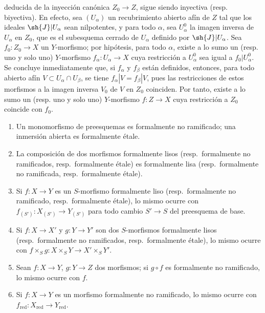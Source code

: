 \begin{remarks}[17.1.2]
\begin{enumerate}
  deducida de la inyección canónica $Z_0\to Z$, sigue siendo inyectiva (resp. biyectiva). En efecto, sea $(U_\alpha)$ un recubrimiento abierto afín de $Z$ tal que los ideales $\sh{J}|U_\alpha$ sean nilpotentes, y para todo $\alpha$, sea $U^0_\alpha$ la imagen inversa de $U_\alpha$ en $Z_0$, que es el subesquema cerrado de $U_\alpha$ definido por $\sh{J}|U_\alpha$. Sea $f_0:Z_0\to X$ un $Y$-morfismo; por hipótesis, para todo $\alpha$, existe a lo sumo un (resp. uno y solo uno) $Y$-morfismo $f_\alpha:U_\alpha\to X$ cuya restricción a $U^0_\alpha$ sea igual a $f_0|U^0_\alpha$. Se concluye inmediatamente que, si $f_\alpha$ y $f_\beta$ están definidos, entonces, para todo abierto afín $V\subset U_\alpha\cap U_\beta$, se tiene $f_\alpha|V=f_\beta|V$, pues las restricciones de estos morfismos a la imagen inversa $V_0$ de $V$ en $Z_0$ coinciden. Por tanto, existe a lo sumo un (resp. uno y solo uno) $Y$-morfismo $f:Z\to X$ cuya restricción a $Z_0$ coincide con $f_0$.
\end{enumerate}
\end{remarks}

\begin{proposition}[17.1.3]
\label{IV.17.1.3}
\begin{enumerate}
  \item[\textup{(i)}] Un monomorfismo de preesquemas es formalmente no ramificado; una inmersión abierta es formalmente étale.
  \item[\textup{(ii)}] La composición de dos morfismos formalmente lisos \textup{(resp.}\ formalmente no ramificados, \textup{resp.}\ formalmente étale\textup{)} es formalmente lisa \textup{(resp.}\ formalmente no ramificada, \textup{resp.}\ formalmente étale\textup{)}.
  \item[\textup{(iii)}] Si $f:X\to Y$ es un $S$-morfismo formalmente liso \textup{(resp.}\ formalmente no ramificado, \textup{resp.}\ formalmente étale\textup{)}, lo mismo ocurre con $f_{(S')}:X_{(S')}\to Y_{(S')}$ para todo cambio $S'\to S$ del preesquema de base.
  \item[\textup{(iv)}] Si $f:X\to X'$ y $g:Y\to Y'$ son dos $S$-morfismos formalmente lisos \textup{(resp.}\ formalmente no ramificados, \textup{resp.}\ formalmente étale\textup{)}, lo mismo ocurre con $f\times_S g:X\times_S Y\to X'\times_S Y'$.
  \item[\textup{(v)}] Sean $f:X\to Y$, $g:Y\to Z$ dos morfismos; si $g\circ f$ es formalmente no ramificado, lo mismo ocurre con $f$.
  \item[\textup{(vi)}] Si $f:X\to Y$ es un morfismo formalmente no ramificado, lo mismo ocurre con $f_{\mathrm{red}}:X_{\mathrm{red}}\to Y_{\mathrm{red}}$.
\end{enumerate}
\end{proposition}

